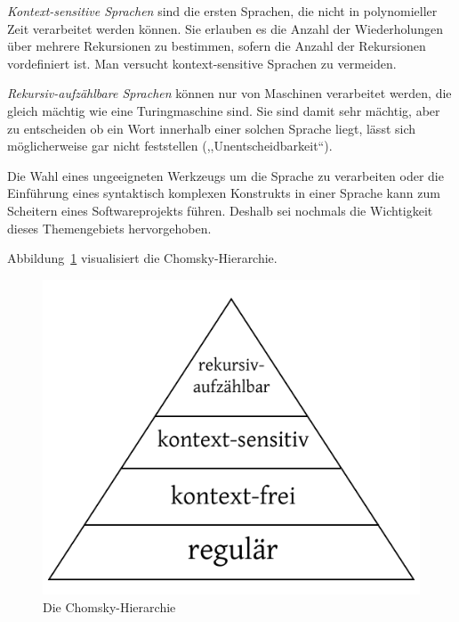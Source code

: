 \emph{Kontext-sensitive Sprachen} sind die ersten Sprachen, die nicht in polynomieller Zeit verarbeitet werden können. Sie erlauben es die Anzahl der Wiederholungen über mehrere Rekursionen zu bestimmen, sofern die Anzahl der Rekursionen vordefiniert ist. Man versucht kontext-sensitive Sprachen zu vermeiden.

\emph{Rekursiv-aufzählbare Sprachen} können nur von Maschinen verarbeitet werden, die gleich mächtig wie eine Turingmaschine sind. Sie sind damit sehr mächtig, aber zu entscheiden ob ein Wort innerhalb einer solchen Sprache liegt, lässt sich möglicherweise gar nicht feststellen (,,Unentscheidbarkeit``).

Die Wahl eines ungeeigneten Werkzeugs um die Sprache zu verarbeiten oder die Einführung eines syntaktisch komplexen Konstrukts in einer Sprache kann zum Scheitern eines Softwareprojekts führen. Deshalb sei nochmals die Wichtigkeit dieses Themengebiets hervorgehoben.

Abbildung~\ref{fig:chomsky_hierarchy} visualisiert die Chomsky-Hierarchie.
%
\begin{figure}[h]
 \begin{center}
  \includegraphics{img/chomsky_hierarchy.pdf}
  \caption{Die Chomsky-Hierarchie}
  \label{fig:chomsky_hierarchy}
 \end{center}
\end{figure}

